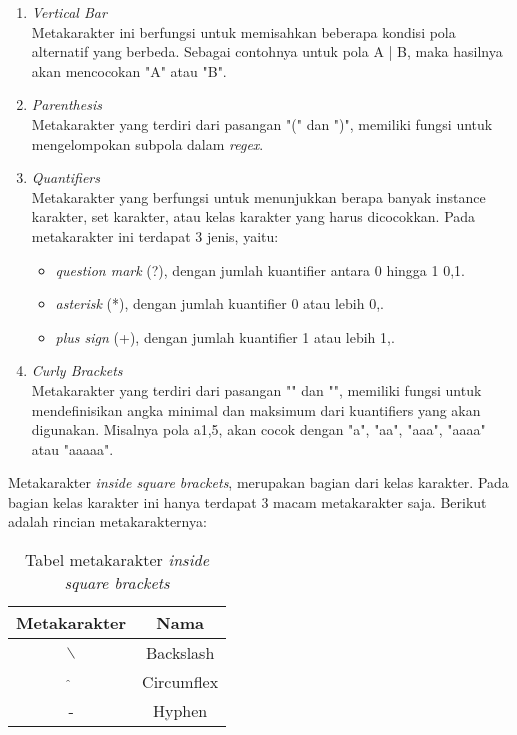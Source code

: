 \begin{enumerate}
	\item \textit{Vertical Bar} \\
	Metakarakter ini berfungsi untuk memisahkan beberapa kondisi pola alternatif yang berbeda. Sebagai contohnya untuk pola A | B, maka hasilnya akan mencocokan "A" atau "B".
	
	\item \textit{Parenthesis} \\
	Metakarakter yang terdiri dari pasangan "(" dan ")", memiliki fungsi untuk mengelompokan subpola dalam \textit{regex}.	
	
	\item \textit{Quantifiers} \\
	Metakarakter yang berfungsi untuk menunjukkan berapa banyak instance karakter, set karakter, atau kelas karakter yang harus dicocokkan. Pada metakarakter ini terdapat 3 jenis, yaitu:
	\begin{itemize}
		\item \textit{question mark} (?), dengan jumlah kuantifier antara 0 hingga 1 {0,1}.
		\item \textit{asterisk} (*), dengan jumlah kuantifier 0 atau lebih {0,}.
		\item \textit{plus sign} (+), dengan jumlah kuantifier 1 atau lebih {1,}.
	\end{itemize}	 

	\item \textit{Curly Brackets} \\
	Metakarakter yang terdiri dari pasangan "{" dan "}", memiliki fungsi untuk mendefinisikan angka minimal dan maksimum dari kuantifiers yang akan digunakan. Misalnya pola a{1,5}, akan cocok dengan "a", "aa", "aaa", "aaaa" atau "aaaaa".
	
\end{enumerate}
		
Metakarakter \textit{inside square brackets}, merupakan bagian dari kelas karakter. Pada bagian kelas  karakter ini hanya terdapat 3 macam metakarakter saja. Berikut adalah rincian metakarakternya:
		
\begin{table}[H]
	\caption {Tabel metakarakter \textit{inside square brackets}} \label{tab:metacharacters-inside}
	\begin{center}
		\begin{tabular}{|c|c|}
		\hline 
		Metakarakter & Nama \\ 
		\hline 
		$\backslash$ & Backslash \\ 
		\hline 
		$\hat{}$ & Circumflex \\ 
		\hline 
		- & Hyphen \\ 
		\hline 
		\end{tabular} 
	\end{center}
\end{table}


